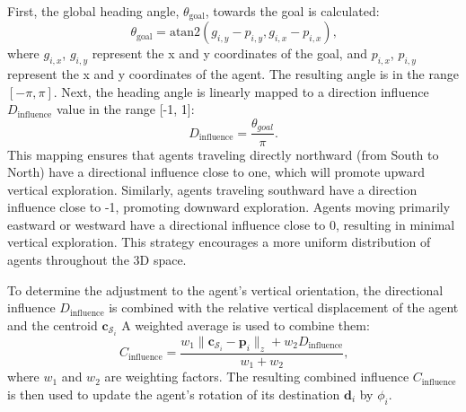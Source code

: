         First, the global heading angle, $\theta_{\text{goal}}$, towards the goal is calculated: 
        \begin{equation}
            \theta_{\text{goal}} = \text{atan2}(g_{i,y} - p_{i,y}, g_{i,x} - p_{i,x})\text{,}
        \end{equation}
        where $g_{i, x}$, $g_{i, y}$ represent the x and y coordinates of the goal, and $p_{i, x}$, $p_{i, y}$ represent the x and y coordinates of the agent.
        The resulting angle is in the range $[-\pi, \pi]$.
        Next, the heading angle is linearly mapped to a direction influence $D_{\text{influence}}$ value in the range [-1, 1]:
        \begin{equation}
            D_{\text{influence}} = \frac{\theta_{goal}}{\pi}\text{.}
        \end{equation}
        This mapping ensures that agents traveling directly northward (from South to North) have a directional influence close to one, which will promote upward vertical exploration. 
        Similarly, agents traveling southward have a direction influence close to -1, promoting downward exploration. 
        Agents moving primarily eastward or westward have a directional influence close to 0, resulting in minimal vertical exploration.
        This strategy encourages a more uniform distribution of agents throughout the 3D space. 

        To determine the adjustment to the agent's vertical orientation, the directional influence $D_{\text{influence}}$ is combined with the relative vertical displacement of the agent and the centroid $\mathbf{c}_{\mathcal{S}_i}$
        A weighted average is used to combine them: 
        \begin{equation}
            \label{eqn:combined_influace}
            C_{\text{influence}} = \frac{w_1 \| \mathbf{c}_{\mathcal{S}_i} - \mathbf{p}_{i} \|_{z} + w_2 D_{\text{influence}}}{w_1 + w_2}\text{,}
        \end{equation} 
        where $w_1$ and $w_2$ are weighting factors. 
        The resulting combined influence $C_{\text{influence}}$ is then used to update the agent's rotation of its destination $\mathbf{d}_i$ by $\phi_i$.

